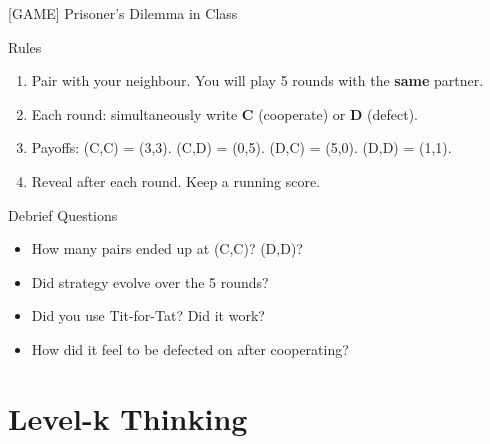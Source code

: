 \documentclass[aspectratio=169]{beamer}
\begin{document}
\begin{frame}{[GAME] Prisoner's Dilemma in Class}
\begin{block}{Rules}
\begin{enumerate}
  \item Pair with your neighbour. You will play 5 rounds with the \textbf{same} partner.
  \item Each round: simultaneously write \textbf{C} (cooperate) or \textbf{D} (defect).
  \item Payoffs: (C,C) = (3,3). (C,D) = (0,5). (D,C) = (5,0). (D,D) = (1,1).
  \item Reveal after each round. Keep a running score.
\end{enumerate}
\end{block}
\begin{block}{Debrief Questions}
\begin{itemize}
  \item How many pairs ended up at (C,C)? (D,D)?
  \item Did strategy evolve over the 5 rounds?
  \item Did you use Tit-for-Tat? Did it work?
  \item How did it feel to be defected on after cooperating?
\end{itemize}
\end{block}
\end{frame}

\section{Level-k Thinking}
\end{document}
